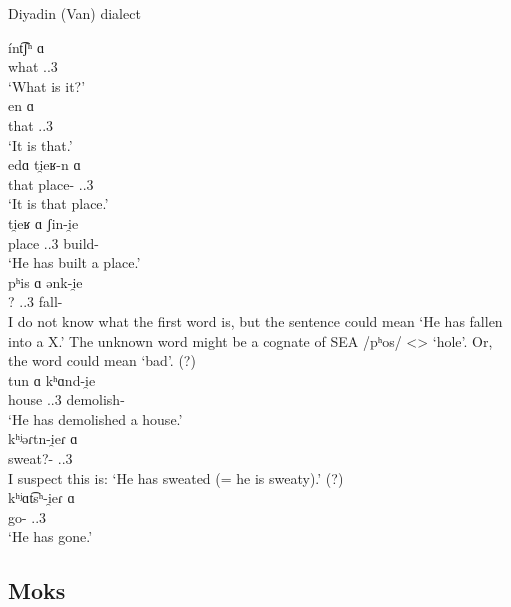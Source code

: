 \begin{exe}
	\ex Diyadin (Van) dialect \label{sent:Van:subdialect:diyadin:diff:aux}
	\begin{xlist}
		\ex \gll \'int͡ʃʰ ɑ \\
		what {\aux}.{\prs}.3{\sg} \\
		\trans `What is it?' \\
		\ex \gll en ɑ \\
		that {\aux}.{\prs}.3{\sg} \\
		\trans `It is that.'\\
		\ex \gll edɑ ti̯eʁ-n ɑ \\
		that place-{} {\aux}.{\prs}.3{\sg} \\
		\trans `It is that place.'\\
		\ex \gll ti̯eʁ ɑ ʃin-i̯e\\
		place {\aux}.{\prs}.3{\sg} build-{\perfcvb} \\
		\trans `He has built a place.' \\
		\ex \gll pʰis ɑ ənk-i̯e\\
		? {\aux}.{\prs}.3{\sg} fall-{\perfcvb} \\
		\trans I do not know what the first word is, but the sentence could mean `He has fallen into a X.' The unknown word might be a cognate of SEA /pʰos/ <> `hole'. Or, the word could mean `bad'. (?) \\
		\ex \gll tun ɑ kʰɑnd-i̯e\\
		house {\aux}.{\prs}.3{\sg} demolish-{\perfcvb} \\
		\trans `He has demolished a house.'\\ 
		\ex \gll kʰʲəɾtn-i̯eɾ ɑ \\
		sweat?-{\perfcvb} {\aux}.{\prs}.3{\sg} \\
		\trans I suspect this is: `He has sweated (= he is sweaty).' (?)\\ 
		\ex \gll kʰʲɑt͡sʰ-i̯eɾ ɑ \\
		go-{\perfcvb} {\aux}.{\prs}.3{\sg} \\
		\trans `He has gone.'\\ 
	\end{xlist}
\end{exe}

\subsection{Moks}

